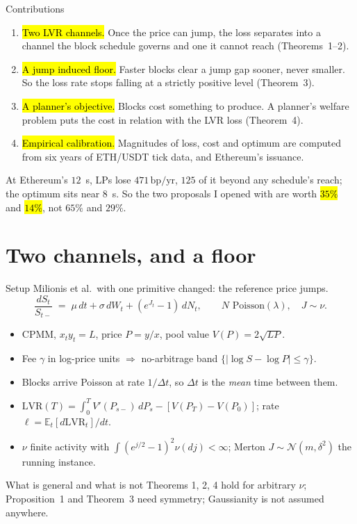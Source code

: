 \documentclass[10pt,xcolor=x11names,aspectratio=169]{beamer}
\newcommand{\dt}{\Delta t}
\newcommand{\E}{\mathbb{E}}
\newcommand{\1}{\mathbf{1}}
\newcommand{\bpyr}{\,\text{bp/yr}}
\begin{document}
\begin{frame}{Contributions}
  \begin{enumerate}
    \item \hl{Two LVR channels.} Once the price can jump, the loss
          separates into a channel the block schedule governs and one it cannot
          reach (Theorems~1--2).
    \item \hl{A jump induced floor.} Faster blocks clear a jump gap
          sooner, never smaller. So the loss rate stops falling at a strictly
          positive level (Theorem~3).
    \item \hl{A planner's objective.} Blocks cost something to
          produce. A planner's welfare problem puts the cost in relation with the LVR loss (Theorem~4).
    \item \hl{Empirical calibration.} Magnitudes of loss, cost and optimum are computed from six 
          years of ETH/USDT tick data, and Ethereum's issuance.
  \end{enumerate}
  \begin{takeaway}[Headline]
    At Ethereum's $12$~s, LPs lose $471\bpyr$, $125$ of it beyond any
    schedule's reach; the optimum sits near $8$~s. So the two proposals I opened
    with are worth \hl{$35\%$} and \hl{$14\%$}, not $65\%$ and $29\%$.
  \end{takeaway}
\end{frame}

\section{Two channels, and a floor}

\begin{frame}{Setup}
  Milionis et al.\ with one primitive changed: the reference price jumps.
  \[
    \frac{dS_t}{S_{t-}} \;=\; \mu\,dt + \sigma\,dW_t + (e^{J_t}-1)\,dN_t,
    \qquad N \text{ Poisson}(\lambda),\quad J \sim \nu .
  \]
  \begin{itemize}
    \item CPMM, $x_ty_t = L$, price $P = y/x$, pool value $V(P) = 2\sqrt{LP}$.
    \item Fee $\gamma$ in log-price units $\Rightarrow$ no-arbitrage band
          $\{|\log S - \log P| \le \gamma\}$.
    \item Blocks arrive Poisson at rate $1/\dt$, so $\dt$ is the \emph{mean}
          time between them.
    \item $\mathrm{LVR}(T) = \int_0^T V'(P_{s-})\,dP_s - [V(P_T)-V(P_0)]$;
          rate $\ell = \E_t[d\mathrm{LVR}_t]/dt$.
    \item $\nu$ finite activity with $\int (e^{j/2}-1)^2 \nu(dj) < \infty$;
          Merton $J\sim\mathcal N(m,\delta^2)$ the running instance.
  \end{itemize}
  \begin{block}{What is general and what is not}
    Theorems 1, 2, 4 hold for arbitrary $\nu$; Proposition~1 and Theorem~3 need symmetry; 
    Gaussianity is not assumed anywhere.
  \end{block}
\end{frame}
\end{document}
